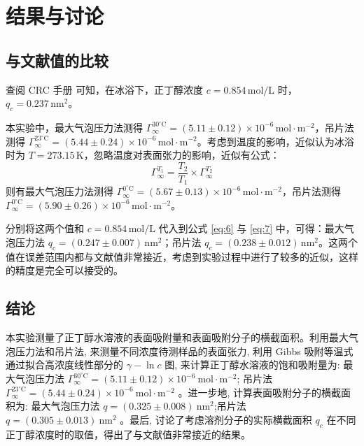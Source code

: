 \section{结果与讨论}

\subsection{与文献值的比较}

查阅 CRC 手册 \cite{haynes2016crc} 可知，在冰浴下，正丁醇浓度 $c = 0.854 \, \mathrm{mol/L}$ 时，$q_c = 0.237 \, \mathrm{nm}^2$。

本实验中，最大气泡压力法测得 $\Gamma_{\infty}^{30^\circ \mathrm{C}} = (5.11 \pm 0.12) \times 10^{-6} \, \mathrm{mol \cdot m^{-2}}$，吊片法测得 $\Gamma_{\infty}^{23^\circ \mathrm{C}} = (5.44 \pm 0.24) \times 10^{-6} \, \mathrm{mol \cdot m^{-2}}$。考虑到温度的影响，近似认为冰浴时为 $T = 273.15 \, \mathrm{K}$，忽略温度对表面张力的影响，近似有公式：
$$
\Gamma_{\infty}^{T_1} = \frac{T_2}{T_1} \times \Gamma_{\infty}^{T_2}
$$
则有最大气泡压力法测得 $\Gamma_{\infty}^{0^\circ \mathrm{C}} = (5.67 \pm 0.13) \times 10^{-6} \, \mathrm{mol \cdot m^{-2}}$，吊片法测得 $\Gamma_{\infty}^{0^\circ \mathrm{C}} = (5.90 \pm 0.26) \times 10^{-6} \, \mathrm{mol \cdot m^{-2}}$。

分别将这两个值和 $c = 0.854 \, \mathrm{mol/L}$ 代入到公式 \eqref{eq:6} 与 \eqref{eq:7} 中，可得：最大气泡压力法 $q_c = (0.247 \pm 0.007) \, \mathrm{nm}^2$；吊片法 $q_c = (0.238 \pm 0.012) \, \mathrm{nm}^2$。这两个值在误差范围内都与文献值非常接近，考虑到实验过程中进行了较多的近似，这样的精度是完全可以接受的。

\subsection{结论}

本实验测量了正丁醇水溶液的表面吸附量和表面吸附分子的横截面积。利用最大气泡压力法和吊片法, 来测量不同浓度待测样品的表面张力, 利用 Gibbs 吸附等温式通过拟合高浓度线性部分的 $\gamma-\ln c$ 图, 来计算正丁醇水溶液的饱和吸附量为: 最大气泡压力法 $\Gamma_{\infty}^{30^{\circ} \mathrm{C}}=(5.11 \pm 0.12) \times 10^{-6} \mathrm{~mol} \cdot \mathrm{m}^{-2}$; 吊片法 $\Gamma_{\infty}^{23^{\circ} \mathrm{C}}=(5.44 \pm 0.24) \times 10^{-6} \mathrm{~mol} \cdot \mathrm{m}^{-2}$ 。进一步地, 计算表面吸附分子的横截面积为: 最大气泡压力法 $q=(0.325 \pm 0.008) \mathrm{~nm}^2$;吊片法 $q=(0.305 \pm 0.013) \mathrm{~nm}^2$ 。最后, 讨论了考虑溶剂分子的实际横截面积 $q_c$ 在不同正丁醇浓度时的取值，得出了与文献值非常接近的结果。

